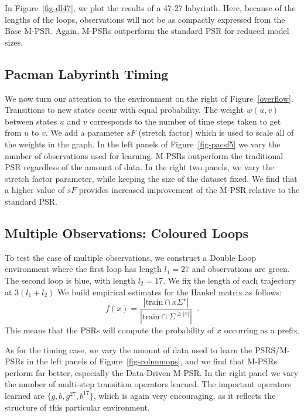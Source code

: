 \documentclass[letterpaper]{article}
\newcommand{\sstar}{\Sigma^\star}
\begin{document}
In Figure~\ref{fig-dl47}, we plot the results of a 47-27 labyrinth.  Here, because of the lengths of the loops, observations will not be as compactly expressed from the Base M-PSR. Again, M-PSRs outperform the standard PSR for reduced model sizes.



\subsection{Pacman Labyrinth Timing}


We now turn our attention to the environment on the right of Figure~\ref{overflow}. Transitions to new states occur with equal probability. The weight $w(u,v)$ between states $u$ and $v$ corresponds to the number of time steps taken to get from $u$ to $v$. We add a parameter $sF$ (stretch factor) which is used to scale all of the weights in the graph. 
In the left panels of Figure~\ref{fig-pacsf5} we vary the number of observations used for learning. M-PSRs outperform the traditional PSR regardless of the amount of data.  In the right two panels, we vary the stretch factor parameter, while  keeping the size of the dataset fixed. We find that a higher value of $sF$ provides increased improvement of the M-PSR relative to the standard PSR.

\subsection{Multiple Observations: Coloured Loops}

To test the case of multiple observations, we construct a Double Loop environment where the first loop has length $l_1=27$ and observations are green. The second loop is blue, with length $l_2=17$. We fix the length of each trajectory at 
$3 (l_1 + l_2)$
We build empirical estimates for the Hankel matrix as follows:
\begin{equation*}
f(x) = \frac{|\mathrm{train} \cap x \sstar |}{|\mathrm{train} \cap \Sigma^{\geq |x|}|} \enspace.
\end{equation*}  
This means that the PSRs will compute the probability of $x$ occurring as a prefix.

As for the timing case, we vary the amount of data used to  learn the PSRS/M-PSRs in the left panels of Figure~\ref{fig-colnumops}, and we find that M-PSRs perform far better, especially the Data-Driven M-PSR. In the right panel we vary the number of multi-step transition operators learned. The important operators learned are $\{g,b,g^{27},b^{17}\}$, which is again very encouraging, as it reflects the structure of this particular environment.
\end{document}
